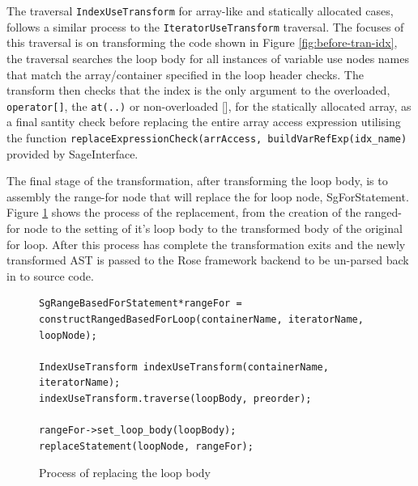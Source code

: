 \documentclass[bsc,frontabs,singlespacing,parskip,deptreport]{infthesis}
\begin{document}
The traversal \texttt{IndexUseTransform} for array-like and statically allocated cases, follows a similar process to the \texttt{IteratorUseTransform} traversal. The focuses of this traversal is on transforming the code shown in Figure \ref{fig:before-tran-idx}, the traversal searches the loop body for all instances of variable use nodes names that match the array/container specified in the loop header checks. The transform then checks that the index is the only argument to the overloaded, \texttt{operator[]}, the \texttt{at(..)} or non-overloaded [], for the statically allocated array, as a final santity check before replacing the entire array access expression utilising the function \texttt{replaceExpressionCheck(arrAccess, buildVarRefExp(idx\_name)} provided by SageInterface.

The final stage of the transformation, after transforming the loop body, is to assembly the range-for node that will replace the for loop node, SgForStatement. Figure \ref{fig:replacing-for-loop-node} shows the process of the replacement, from the creation of the ranged-for node to the setting of it's loop body to the transformed body of the original for loop. After this process has complete the transformation exits and the newly transformed AST is passed to the Rose framework backend to be un-parsed back in to source code.

\begin{figure}[H]
    \centering
    \begin{verbatim}
SgRangeBasedForStatement*rangeFor =
constructRangedBasedForLoop(containerName, iteratorName, loopNode);

IndexUseTransform indexUseTransform(containerName, iteratorName);
indexUseTransform.traverse(loopBody, preorder);

rangeFor->set_loop_body(loopBody);
replaceStatement(loopNode, rangeFor);
    \end{verbatim}
    \caption{Process of replacing the loop body}
    \label{fig:replacing-for-loop-node}
\end{figure}

\end{document}
